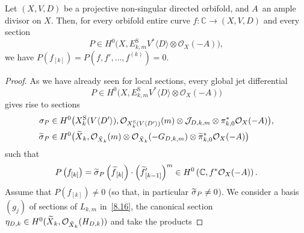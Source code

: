 \documentclass[AHL,Unicode,longabstracts,published]{cedram}
\newcommand*\rS{\mathrm{S}}
\newcommand*\cJ{\mathcal{J}}
\newcommand*\cO{\mathcal{O}}
\newcommand*\bC{\mathbb{C}}
\let\oldtilde\tilde
\renewcommand*{\tilde}[1]{\mathchoice{\widetilde{#1}}{\widetilde{#1}}{\oldtilde{#1}}{\oldtilde{#1}}}
\begin{document}
\begin{lemm}
Let $(X,V,D)$ be a projective non-singular directed orbifold, and $A$~an ample divisor on $X$. Then, for every orbifold entire curve $f\colon\bC\to(X,V,D)$ and every section
\[
P\in H^0\big(X,E^\rS_{k,m}V^*\langle D\rangle\otimes\cO_X(-A)\big),
\]
we have $P(f_{[k]})=P(f,f',\dotsc,f^{(k)})=0$.
\end{lemm}
\begin{proof}
As we have already seen for local sections, every global jet differential
\[
P\in H^0\big(X,E^\rS_{k,m}V^*\langle D\rangle\otimes\cO_X(-A)\big)
\]
gives rise to sections
\begin{align*}
\sigma_P&
\in H^0\big(X^\rS_k(V\langle D'\rangle),
\cO_{X^\rS_k(V\langle D'\rangle)}(m) \otimes \cJ_{D,k,m}\otimes\pi_{k,0}^*\cO_X(-A)
\big),
\\
\tilde\sigma_P&
\in H^0\big(
\tilde X_k,
\cO_{\tilde X_k}(m) \otimes \cO_{\tilde X_k}(-G_{D,k,m})\otimes\tilde\pi_{k,0}^*\cO_X(-A)
\big)
\end{align*}
such that
\[
P\left(f_{[k]}\right)=\tilde\sigma_P\left(\tilde f_{[k]}\right)\cdot \left(\tilde f'_{[k-1]}\right)^m
\in H^0\left(\bC,f^*\cO_X(-A)\right).
\]
Assume that $P(f_{[k]})\ne 0$ (so that, in particular $\tilde\sigma_P\ne 0$). We consider a basis $(g_j)$ of sections of $L_{k,m}$ in~\eqref{8.16}, the canonical section $\eta_{D,k}\in H^0(\tilde X_k,\cO_{\tilde X_k}(H_{D,k}))$ and take the products


\end{proof}
\end{document}
